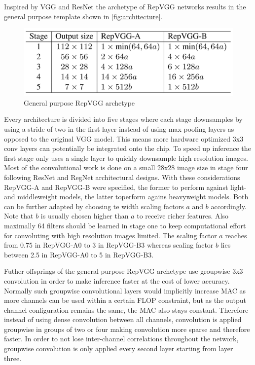 Inspired by VGG and ResNet the archetype of RepVGG networks results in the general purpose template shown in \autoref{fig:architecture}.

\begin{figure}[t]
	\begin{center}
		\includegraphics[width=0.8\linewidth]{images/architecture.PNG}
	\end{center}
	\caption{General purpose RepVGG archetype}
	\label{fig:architecture}
\end{figure}

Every architecture is divided into five stages where each stage downsamples by using a stride of two in the first layer instead of using max pooling layers as opposed to the original VGG model. This means more hardware optimized 3x3 conv layers can potentially be integrated onto the chip. To speed up inference the first stage only uses a single layer to quickly downsample high resolution images. Most of the convolutional work is done on a small 28x28 image size in stage four following ResNet and RegNet architectural designs. With these considerations RepVGG-A and RepVGG-B were specified, the former to perform against light- and middleweight models, the latter toperform agains heavyweight models. Both can be further adapted by choosing te width scaling factors $a$ and $b$ accordingly. Note that $b$ is usually chosen higher than $a$ to receive richer features. Also maximally 64 filters should be learned in stage one to keep computational effort for convoluting with high resolution images limited. The scaling factor $a$ reaches from 0.75 in RepVGG-A0 to 3 in RepVGG-B3 whereas scaling factor $b$ lies between 2.5 in RepVGG-A0 to 5 in RepVGG-B3.  

Futher offsprings of the general purpose RepVGG archetype use groupwise 3x3 convolution in order to make inference faster at the cost of lower accuracy. Normally such groupwise convolutional layers would implicitly increase MAC as more channels can be used within a certain FLOP constraint, but as the output channel configuration remains the same, the MAC also stays constant. Therefore instead of using dense convolution between all channels, convolution is applied groupwise in groups of two or four making convolution more sparse and therefore faster. In order to not lose inter-channel correlations throughout the network, groupwise convolution is only applied every second layer starting from layer three.  
